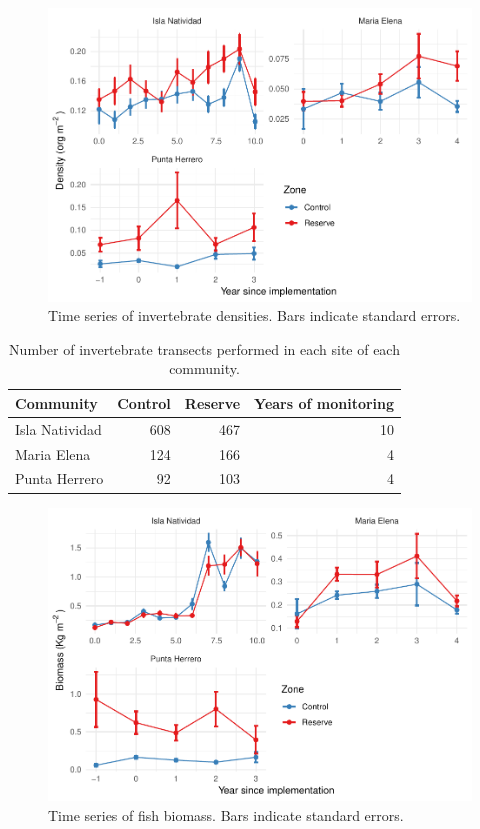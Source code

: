 \documentclass[utf8]{frontiers_suppmat} %
\begin{document}
\begin{figure}
\centering
\includegraphics{SupplementaryMaterial_files/figure-latex/unnamed-chunk-4-1.pdf}
\caption{\label{fig:unnamed-chunk-4}Time series of invertebrate densities. Bars indicate standard errors.}
\end{figure}

\clearpage

\begin{table}[t]

\caption{\label{tab:unnamed-chunk-5}Number of invertebrate transects performed in each site of each community.}
\centering
\begin{tabular}{lrrr}
\toprule
Community & Control & Reserve & Years of monitoring\\
\midrule
Isla Natividad & 608 & 467 & 10\\
Maria Elena & 124 & 166 & 4\\
Punta Herrero & 92 & 103 & 4\\
\bottomrule
\end{tabular}
\end{table}

\begin{figure}
\centering
\includegraphics{SupplementaryMaterial_files/figure-latex/unnamed-chunk-6-1.pdf}
\caption{\label{fig:unnamed-chunk-6}Time series of fish biomass. Bars indicate standard errors.}
\end{figure}
\end{document}
